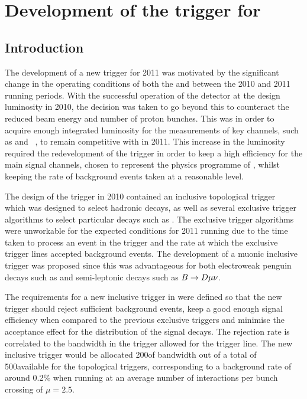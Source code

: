 \section{Development of the trigger for \BdToKstmm}
\label{sec:lhcb:trigdev}

\subsection{Introduction}

The development of a new \lhcb trigger for 2011 was motivated by the significant change in the operating conditions of
both the \lhc and \lhcb between the 2010 and 2011 running periods. 
With the successful operation of the detector at the design luminosity in 2010, the decision was taken  
to go beyond this to counteract the reduced beam energy and number of proton bunches.
This was in order to acquire enough integrated luminosity for the \lhcb measurements of key channels, 
such as \Bsmm and \BdToKstmm~\cite{Adeva:2009ny}, to remain competitive with \cms in 2011.
This increase in the luminosity required the redevelopment of the trigger in order to keep 
a high efficiency for the main signal channels, chosen to represent the physics programme of \lhcb, whilst keeping 
the rate of background events taken at a reasonable level.

The design of the \lhcb trigger in 2010 contained an inclusive topological trigger~\cite{Alves:2008zz} which was designed to
 select hadronic \B decays, as well as several exclusive trigger algorithms to select particular decays such as \BdToKstmm.
The exclusive trigger algorithms were unworkable for the expected conditions for 2011 running due to the time taken to process an event in the trigger and 
the rate at which the exclusive trigger lines accepted background events.%
The development of a muonic inclusive trigger was proposed since this was advantageous for both electroweak penguin decays 
such as \BdToKstmm and semi-leptonic decays such as $B\rightarrow D\mu\nu$.

The requirements for a new inclusive trigger in \lhcb were defined so that the new trigger should reject sufficient background events, keep a good enough signal efficiency
when compared to the previous exclusive triggers and minimise the acceptance effect for the distribution of the signal decays.
The rejection rate is correlated to the bandwidth in the trigger allowed for the trigger line.
The new inclusive trigger would be allocated 200\hz of bandwidth out of a total of 500\hz available for the topological triggers,
corresponding to a background rate of around 0.2\% when running at an average number of interactions per bunch crossing of $\mu=2.5$.

